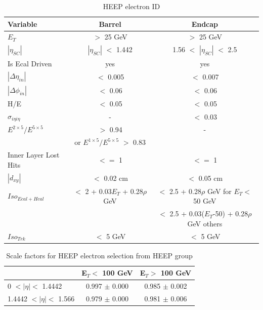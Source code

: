 \begin{table}[hp]
\begin{center}
\begin{tabular}{|l|c|c|}
\hline
Variable & Barrel & Endcap \\
\hline
$E_{T}$ & $>$ 25 GeV & $>$ 25 GeV \\
$|\eta_{SC}|$ & $|\eta_{SC}|$ $<$ 1.442 & 1.56 $<$ $|\eta_{SC}|$ $<$ 2.5 \\
Is Ecal Driven & yes & yes \\
$|\Delta\eta_{in}|$ & $<$ 0.005 & $<$ 0.007 \\
$|\Delta\phi_{in}|$ & $<$ 0.06 & $<$ 0.06 \\
H/E & $<$ 0.05 & $<$ 0.05 \\
$\sigma_{i\eta i\eta}$ & - & $<$ 0.03 \\
$E^{2\times5}/E^{5\times5}$ & $>$ 0.94 & - \\
 & or $E^{1\times5}/E^{5\times5}$ $>$ 0.83 & \\
Inner Layer Lost Hits & $<=$ 1 & $<=$ 1 \\
$|d_{xy}|$ & $<$ 0.02 cm & $<$ 0.05 cm\\
\hline
$Iso_{Ecal+Hcal}$  & $<$ 2 + 0.03$E_{T}$ + 0.28$\rho$ GeV & $<$ 2.5 + 0.28$\rho$ GeV for $E_{T} <$ 50 GeV \\
 & & $<$ 2.5 + 0.03($E_{T}$-50) + 0.28$\rho$ GeV others \\
$Iso_{Trk}$  & $<$ 5 GeV& $<$ 5 GeV\\
\hline
\end{tabular}
\caption{HEEP electron ID}
\label{tab:HeepEid}
\end{center}
\end{table}

\begin{table}[hp]
\begin{center}
\begin{tabular}{|l|c|c|}
\hline
 & E$_{T} <$ 100 GeV & E$_{T} >$ 100 GeV \\
\hline
0 $< |\eta| <$ 1.4442 & 0.997 $\pm$ 0.000 & 0.985 $\pm$ 0.002 \\
1.4442 $< |\eta| <$ 1.566 & 0.979 $\pm$ 0.000 & 0.981 $\pm$ 0.006 \\
\hline
\end{tabular}
\caption{\label{tab:SF_heep}Scale factors for HEEP electron selection from HEEP group}
\end{center}
\end{table}

